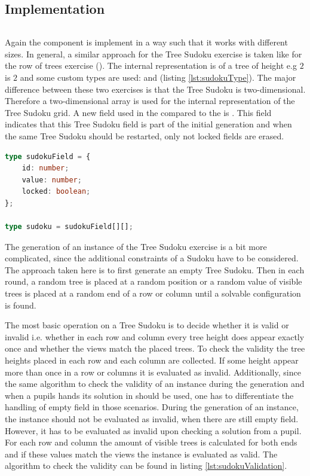 \subsection{Implementation}

\begin{lstlisting}[language=TypeScript,caption={},label={lst:}]
\end{lstlisting}

Again the  component is implement in a way such that it works with different sizes. In general, a similar approach for the Tree Sudoku exercise is taken like for the row of trees exercise (). The internal representation is of a tree of height e.g $2$ is $2$ and some custom types are used:  and  (listing \ref{lst:sudokuType}). The major difference between these two exercises is that the Tree Sudoku is two-dimensional. Therefore a two-dimensional array is used for the internal representation of the Tree Sudoku grid. A new field used in the  compared to the  is . This field indicates that this Tree Sudoku field is part of the initial generation and when the same Tree Sudoku should be restarted, only not locked fields are erased.

\begin{lstlisting}[language=TypeScript,caption={Definition of the custom sudoku and sudokuField type},label={lst:sudokuType}]
type sudokuField = {
    id: number;
    value: number;
    locked: boolean;
};

type sudoku = sudokuField[][];
\end{lstlisting}

The generation of an instance of the Tree Sudoku exercise is a bit more complicated, since the additional constraints of a Sudoku have to be considered. The approach taken here is to first generate an empty Tree Sudoku. Then in each round, a random tree is placed at a random position or a random value of visible trees is placed at a random end of a row or column until a solvable configuration is found. 

The most basic operation on a Tree Sudoku is to decide whether it is valid or invalid i.e. whether in each row and column every tree height does appear exactly once and whether the views match the placed trees.
To check the validity the tree heights placed in each row and each column are collected. If some height appear more than once in a row or columns it is evaluated as invalid. Additionally, since the same algorithm to check the validity of an instance during the generation and when a pupils hands its solution in should be used, one has to differentiate the handling of empty field in those scenarios. During the generation of an instance, the instance should not be evaluated as invalid, when there are still empty field. However, it has to be evaluated as invalid upon checking a solution from a pupil. 
For each row and column the amount of visible trees is calculated for both ends and if these values match the views the instance is evaluated as valid. The algorithm to check the validity can be found in listing \ref{lst:sudokuValidation}.

